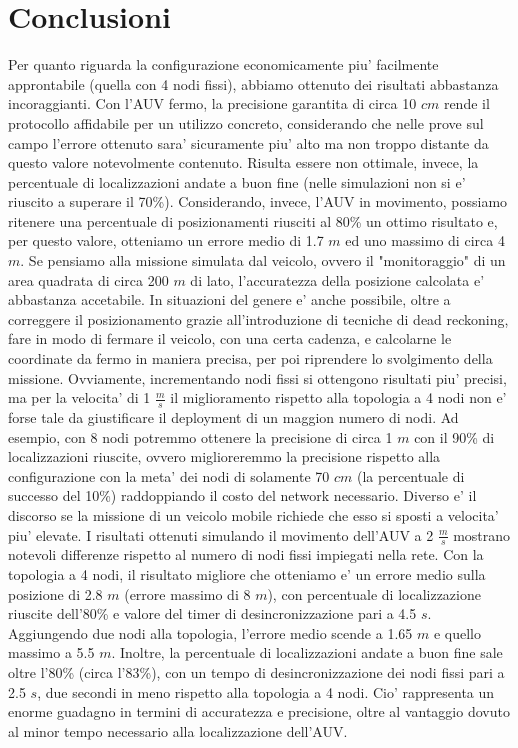 \documentclass[Lau,binding=0.6cm]{sapthesis}
\begin{document}
\section{Conclusioni}
Per quanto riguarda la configurazione economicamente piu' facilmente approntabile (quella con 4 nodi fissi), abbiamo ottenuto dei risultati abbastanza incoraggianti. Con l'AUV fermo, la precisione garantita di circa 10 $cm$ rende il protocollo  affidabile per un utilizzo concreto, considerando che nelle prove sul campo l'errore ottenuto sara' sicuramente piu' alto ma non troppo distante da questo valore notevolmente contenuto.
Risulta essere non ottimale, invece, la percentuale di localizzazioni andate a buon fine (nelle simulazioni non si e' riuscito a superare il  70\%). Considerando, invece, l'AUV in movimento, possiamo ritenere una percentuale di posizionamenti riusciti al 80\% un ottimo risultato e, per questo valore, otteniamo un errore medio di 1.7 $m$ ed uno massimo di circa 4 $m$. Se pensiamo alla missione simulata dal veicolo, ovvero il "monitoraggio" di un area quadrata di circa 200 $m$ di lato, l'accuratezza della posizione calcolata e' abbastanza accetabile. In situazioni del genere e' anche possibile, oltre a correggere il posizionamento grazie all'introduzione di tecniche di dead reckoning, fare in modo di fermare il veicolo, con una certa cadenza, e calcolarne le coordinate da fermo in maniera precisa, per poi riprendere lo svolgimento della missione.
\newline
Ovviamente, incrementando nodi fissi si ottengono risultati piu' precisi, ma per la velocita' di 1 $\frac{m}{s}$ il miglioramento rispetto alla topologia a 4 nodi non e' forse tale da giustificare il deployment di un maggion numero di nodi.
Ad esempio, con 8 nodi potremmo ottenere la precisione di circa 1 $m$ con il 90\% di localizzazioni riuscite, ovvero miglioreremmo la precisione rispetto alla configurazione con la meta' dei nodi di solamente 70 $cm$ (la percentuale di successo del 10\%) raddoppiando il costo del network necessario.
Diverso e' il discorso se la missione di un veicolo mobile richiede che esso si sposti a velocita' piu' elevate. I risultati ottenuti simulando il movimento dell'AUV a 2 $\frac{m}{s}$ mostrano notevoli differenze rispetto al numero di nodi fissi impiegati nella rete.
Con la topologia a 4 nodi, il risultato migliore che otteniamo e' un errore medio sulla posizione di 2.8 $m$ (errore massimo di 8 $m$), con percentuale di localizzazione riuscite dell'80\% e valore del timer di desincronizzazione pari a 4.5 $s$.
Aggiungendo due nodi alla topologia, l'errore medio scende a 1.65 $m$ e quello massimo a 5.5 $m$. Inoltre, la percentuale di localizzazioni andate a buon fine sale oltre l'80\% (circa l'83\%), con un tempo di desincronizzazione dei nodi fissi pari a 2.5 $s$, due secondi in meno rispetto alla topologia a 4 nodi. Cio' rappresenta un enorme guadagno in termini di accuratezza e precisione, oltre al vantaggio dovuto al minor tempo necessario alla localizzazione dell'AUV.
\end{document}
